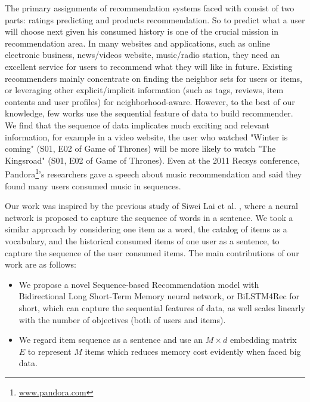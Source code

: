 \documentclass[runningheads]{llncs}
\begin{document}
The primary assignments of recommendation systems faced with consist of two parts: ratings predicting and products recommendation. So to predict what a user will choose next given his consumed history is one of the crucial mission \cite{Wan2015NextBR} in recommendation area. In many websites and applications, such as online electronic business, news/videos website, music/radio station, they need an excellent service for users to recommend what they will like in future. Existing recommenders mainly concentrate on finding the neighbor sets for users or items, or leveraging other explicit/implicit information (such as tags, reviews, item contents and user profiles) for neighborhood-aware. However, to the best of our knowledge, few works use the sequential feature of data to build recommender. We find that the sequence of data implicates much exciting and relevant information, for example in a video website, the user who watched "Winter is coming" (S01, E02 of Game of Thrones) will be more likely to watch "The Kingsroad" (S01, E02 of Game of Thrones). Even at the 2011 Recsys conference, Pandora\footnote{\url{www.pandora.com}}'s researchers gave a speech about music recommendation and said they found many users consumed music in sequences.

Our work was inspired by the previous study of Siwei Lai et al. \cite{AAAI159745}, where a neural network is proposed to capture the sequence of words in a sentence.  We took a similar approach by considering one item as a word, the catalog of items as a vocabulary, and the historical consumed items of one user as a sentence, to capture the sequence of the user consumed items. The main contributions of our work are as follows:
 \begin{itemize}

\item We propose a novel Sequence-based Recommendation model with Bidirectional Long Short-Term Memory neural network,  or BiLSTM4Rec for short, which can capture the sequential features of data, as well scales linearly with the number of objectives (both of users and items).
\item We regard item sequence as a sentence and use an $M\times d$ embedding matrix $E$ to represent $M$ items which reduces memory cost evidently when faced big data.
 \end{itemize}

\end{document}
